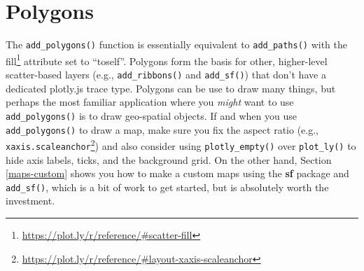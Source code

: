 \documentclass[
  12pt,
]{krantz}
\newenvironment{Shaded}{\begin{snugshade}}{\end{snugshade}}
\newcommand{\DataTypeTok}[1]{\textcolor[rgb]{0.13,0.29,0.53}{#1}}
\newcommand{\FloatTok}[1]{\textcolor[rgb]{0.00,0.00,0.81}{#1}}
\newcommand{\KeywordTok}[1]{\textcolor[rgb]{0.13,0.29,0.53}{\textbf{#1}}}
\newcommand{\NormalTok}[1]{#1}
\newcommand{\OperatorTok}[1]{\textcolor[rgb]{0.81,0.36,0.00}{\textbf{#1}}}
\newcommand{\OtherTok}[1]{\textcolor[rgb]{0.56,0.35,0.01}{#1}}
\newcommand{\StringTok}[1]{\textcolor[rgb]{0.31,0.60,0.02}{#1}}
\renewcommand{\href}[2]{#2\footnote{\url{#1}}}
\begin{document}
\hypertarget{polygons}{%
\section{Polygons}\label{polygons}}

The \texttt{add\_polygons()} function is essentially equivalent to \texttt{add\_paths()} with the \href{https://plot.ly/r/reference/\#scatter-fill}{fill} attribute set to ``toself''. Polygons form the basis for other, higher-level scatter-based layers (e.g., \texttt{add\_ribbons()} and \texttt{add\_sf()}) that don't have a dedicated plotly.js trace type. Polygons can be use to draw many things, but perhaps the most familiar application where you \emph{might} want to use \texttt{add\_polygons()} is to draw geo-spatial objects. If and when you use \texttt{add\_polygons()} to draw a map, make sure you fix the aspect ratio (e.g., \href{https://plot.ly/r/reference/\#layout-xaxis-scaleanchor}{\texttt{xaxis.scaleanchor}}) and also consider using \texttt{plotly\_empty()} over \texttt{plot\_ly()} to hide axis labels, ticks, and the background grid. On the other hand, Section \ref{maps-custom} shows you how to make a custom maps using the \textbf{sf} package and \texttt{add\_sf()}, which is a bit of work to get started, but is absolutely worth the investment.

\begin{Shaded}
\end{Shaded}
\end{document}
